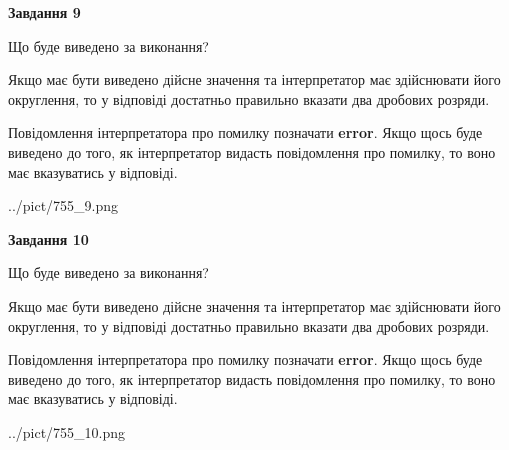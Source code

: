 \documentclass[12pt, ukrainian]{article}
\begin{document}
{\begin {Large}
{\begin {center}\textbf{Завдання 9}\end {center}}\par
Що буде виведено за виконання? \par

Якщо має бути виведено дійсне значення та інтерпретатор має здійснювати його округлення, 
то у відповіді достатньо правильно вказати два дробових розряди.

Повідомлення інтерпретатора про помилку позначати \textbf{error}.
Якщо щось буде виведено до того, як інтерпретатор видасть повідомлення про помилку, 
то воно має вказуватись у відповіді. \par

\begin{center}
	{../pict/755_9.png}
\end{center}
\newpage

{\begin {center}\textbf{Завдання 10}\end {center}}\par
Що буде виведено за виконання? \par

Якщо має бути виведено дійсне значення та інтерпретатор має здійснювати його округлення, 
то у відповіді достатньо правильно вказати два дробових розряди.

Повідомлення інтерпретатора про помилку позначати \textbf{error}.
Якщо щось буде виведено до того, як інтерпретатор видасть повідомлення про помилку, 
то воно має вказуватись у відповіді. \par

\begin{center}
	{../pict/755_10.png}
\end{center}
\newpage

\end {Large}}
\end{document}

